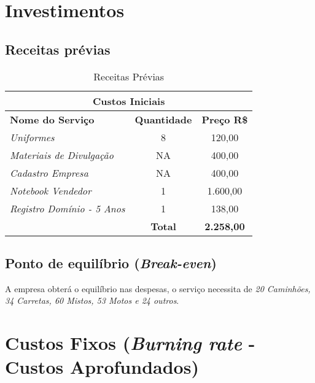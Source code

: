 	\section{Investimentos}
		
		\subsection{Receitas prévias}
			
			
			\begin{table}[htbp]
				\centering
				\caption{Receitas Prévias}
				
				
					\begin{tabularx}{\linewidth}{|X|c|c|}
						\toprule
						\multicolumn{3}{c}{\cellcolor{gray!50}\textbf{Custos Iniciais}} \\
						\midrule
						\textbf{Nome do Serviço} & \textbf{Quantidade} & \textbf{Preço R\$} \\
						\midrule
						\textit{Uniformes}					&	8	& 120,00 \\
						\textit{Materiais de Divulgação}		&	NA	& 400,00 \\
						\textit{Cadastro Empresa}			&	NA	& 400,00 \\
						\textit{Notebook Vendedor}			&	1	& 1.600,00 \\
						\textit{Registro Domínio - 5 Anos}	&	1	& 138,00 \\
						~ & \textbf{Total} & \textbf{2.258,00} \\
						\bottomrule
					\end{tabularx}
				
				
				\label{tab:receitasPrevias2}%
			\end{table}%
			
			
		\subsection{Ponto de equilíbrio (\textit{Break-even})}
			A empresa obterá o equilíbrio nas despesas, o serviço necessita de \emph{20 Caminhões, 34 Carretas, 60 Mistos, 53 Motos e 24 outros}.		
		
		
	\section{Custos Fixos (\textit{Burning rate} - Custos Aprofundados)}
		
